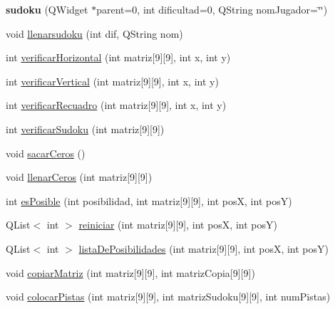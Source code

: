\begin{DoxyCompactItemize}
\item 
\hypertarget{classsudoku_a4fca394ee6b069056fa9e12ad5636e2a}{{\bfseries sudoku} (Q\-Widget $\ast$parent=0, int dificultad=0, Q\-String nom\-Jugador=\char`\"{}\char`\"{})}\label{classsudoku_a4fca394ee6b069056fa9e12ad5636e2a}

\item 
void \hyperlink{classsudoku_a617ded672f64a712fdb32cdb39587e41}{llenarsudoku} (int dif, Q\-String nom)
\item 
int \hyperlink{classsudoku_a9eb0e3df6cdeda0dd3895e982c8eb639}{verificar\-Horizontal} (int matriz\mbox{[}9\mbox{]}\mbox{[}9\mbox{]}, int x, int y)
\item 
int \hyperlink{classsudoku_aae809634b98c50419673cbfbeeed1424}{verificar\-Vertical} (int matriz\mbox{[}9\mbox{]}\mbox{[}9\mbox{]}, int x, int y)
\item 
int \hyperlink{classsudoku_a1b70089b6aa10d82a1221cd393e317d4}{verificar\-Recuadro} (int matriz\mbox{[}9\mbox{]}\mbox{[}9\mbox{]}, int x, int y)
\item 
int \hyperlink{classsudoku_a666728002336616bf9c8443574e2a0a2}{verificar\-Sudoku} (int matriz\mbox{[}9\mbox{]}\mbox{[}9\mbox{]})
\item 
void \hyperlink{classsudoku_a050dfc7ca3f27165923db48d7b3fafd9}{sacar\-Ceros} ()
\item 
void \hyperlink{classsudoku_a0a1d90110883ce8af57b1b3aeef28567}{llenar\-Ceros} (int matriz\mbox{[}9\mbox{]}\mbox{[}9\mbox{]})
\item 
int \hyperlink{classsudoku_ab7095d78fa0050d8b4f33ae71afd7ddd}{es\-Posible} (int posibilidad, int matriz\mbox{[}9\mbox{]}\mbox{[}9\mbox{]}, int pos\-X, int pos\-Y)
\item 
Q\-List$<$ int $>$ \hyperlink{classsudoku_af1d2b7818b60dac0845d719f0aec9cb2}{reiniciar} (int matriz\mbox{[}9\mbox{]}\mbox{[}9\mbox{]}, int pos\-X, int pos\-Y)
\item 
Q\-List$<$ int $>$ \hyperlink{classsudoku_a781664045c5796e65aaeef1e7f7f26d5}{lista\-De\-Posibilidades} (int matriz\mbox{[}9\mbox{]}\mbox{[}9\mbox{]}, int pos\-X, int pos\-Y)
\item 
void \hyperlink{classsudoku_ac3f30cbd81fbb88c7da0e4aaa9fc2e7a}{copiar\-Matriz} (int matriz\mbox{[}9\mbox{]}\mbox{[}9\mbox{]}, int matriz\-Copia\mbox{[}9\mbox{]}\mbox{[}9\mbox{]})
\item 
void \hyperlink{classsudoku_a523bdf77cfc3221b46a2ef2ef6f35dc7}{colocar\-Pistas} (int matriz\mbox{[}9\mbox{]}\mbox{[}9\mbox{]}, int matriz\-Sudoku\mbox{[}9\mbox{]}\mbox{[}9\mbox{]}, int num\-Pistas)

\end{DoxyCompactItemize}
